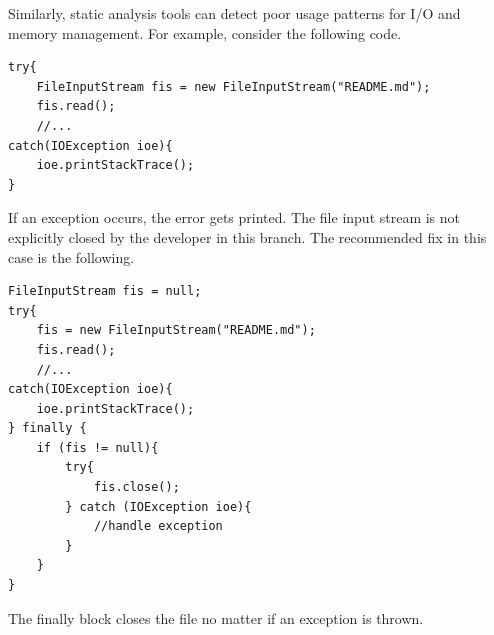 \documentclass[a4paper, openany]{memoir}
\begin{document}
Similarly, static analysis tools can detect poor usage patterns for I/O and memory management. For example, consider the following code.
\begin{verbatim}
try{
    FileInputStream fis = new FileInputStream("README.md");
    fis.read();
    //...
catch(IOException ioe){
    ioe.printStackTrace();
}
\end{verbatim}
If an exception occurs, the error gets printed. The file input stream is not explicitly closed by the developer in this branch. The recommended fix in this case is the following.
\begin{verbatim}
FileInputStream fis = null;
try{
    fis = new FileInputStream("README.md");
    fis.read();
    //...
catch(IOException ioe){
    ioe.printStackTrace();
} finally {
    if (fis != null){
        try{
            fis.close();
        } catch (IOException ioe){
            //handle exception
        }
    }
}
\end{verbatim}
The finally block closes the file no matter if an exception is thrown.
\end{document}
